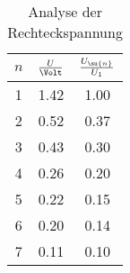 \begin{table}
  \centering
  \begin{tabular}{c c c}
    \toprule
    $n$ & $\frac{U}{\Volt}$ & $\frac{U_\su{n}}{U_1}$ \\
    \midrule
    1   &   1.42  &   1.00 \\
    2   &   0.52  &   0.37 \\
    3   &   0.43  &   0.30 \\
    4   &   0.26  &   0.20 \\
    5   &   0.22  &   0.15 \\
    6   &   0.20  &   0.14 \\
    7   &   0.11  &   0.10 \\
    \bottomrule
  \end{tabular}
  \caption{Analyse der Rechteckspannung}
  \label{anarecht}
\end{table}
